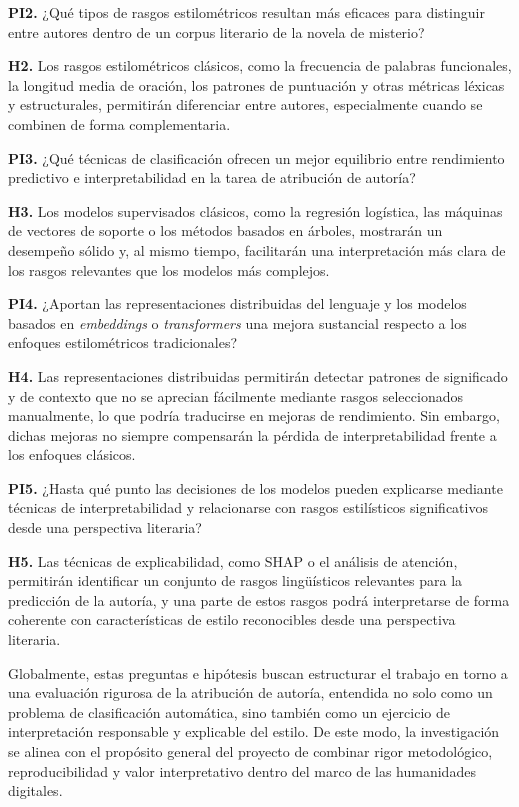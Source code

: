 \documentclass[IB]{TFUOC}%
\begin{document}
\textbf{PI2.} ¿Qué tipos de rasgos estilométricos resultan más eficaces para distinguir entre autores dentro de un corpus literario de la novela de misterio?

\textbf{H2.} Los rasgos estilométricos clásicos, como la frecuencia de palabras funcionales, la longitud media de oración, los patrones de puntuación y otras métricas léxicas y estructurales, permitirán diferenciar entre autores, especialmente cuando se combinen de forma complementaria.

\textbf{PI3.} ¿Qué técnicas de clasificación ofrecen un mejor equilibrio entre rendimiento predictivo e interpretabilidad en la tarea de atribución de autoría?

\textbf{H3.} Los modelos supervisados clásicos, como la regresión logística, las máquinas de vectores de soporte o los métodos basados en árboles, mostrarán un desempeño sólido y, al mismo tiempo, facilitarán una interpretación más clara de los rasgos relevantes que los modelos más complejos.

\textbf{PI4.} ¿Aportan las representaciones distribuidas del lenguaje y los modelos basados en \textit{embeddings} o \textit{transformers} una mejora sustancial respecto a los enfoques estilométricos tradicionales?

\textbf{H4.} Las representaciones distribuidas permitirán detectar patrones de significado y de contexto que no se aprecian fácilmente mediante rasgos seleccionados manualmente, lo que podría traducirse en mejoras de rendimiento. Sin embargo, dichas mejoras no siempre compensarán la pérdida de interpretabilidad frente a los enfoques clásicos.

\textbf{PI5.} ¿Hasta qué punto las decisiones de los modelos pueden explicarse mediante técnicas de interpretabilidad y relacionarse con rasgos estilísticos significativos desde una perspectiva literaria?

\textbf{H5.} Las técnicas de explicabilidad, como SHAP o el análisis de atención, permitirán identificar un conjunto de rasgos lingüísticos relevantes para la predicción de la autoría, y una parte de estos rasgos podrá interpretarse de forma coherente con características de estilo reconocibles desde una perspectiva literaria.

Globalmente, estas preguntas e hipótesis buscan estructurar el trabajo en torno a una evaluación rigurosa de la atribución de autoría, entendida no solo como un problema de clasificación automática, sino también como un ejercicio de interpretación responsable y explicable del estilo. De este modo, la investigación se alinea con el propósito general del proyecto de combinar rigor metodológico, reproducibilidad y valor interpretativo dentro del marco de las humanidades digitales.
\end{document}

